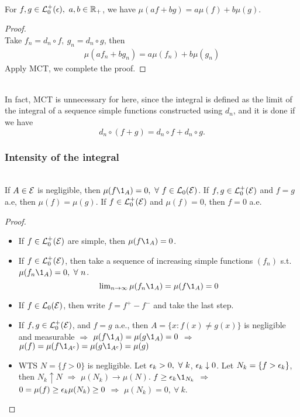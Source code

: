 \clearpage
\begin{corollary}\ \\
For $f,g \in \mathcal{L}_0^+(\epsilon),\ a,b \in \mathbb{R}_+$, we have $\mu(af + bg) = a\mu(f) + b\mu(g)$.
\end{corollary}
\begin{proof}\ \\
Take $f_n = d_n \circ f,\ g_n = d_n \circ g$, then
\begin{align*}
    \mu(af_n + bg_n) = a \mu(f_n) + b \mu(g_n)
\end{align*}
Apply MCT, we complete the proof.
\end{proof}
\begin{remark}\ \\
In fact, MCT is unnecessary for here, since the integral is defined as the limit of the integral of a sequence simple functions constructed using $d_n$, and it is done if we have
\begin{equation*}
    d_n \circ (f + g) = d_n \circ f + d_n \circ g.
\end{equation*}
\end{remark}

\vspace{6pt}
\subsubsection{Intensity of the integral}

\begin{proposition}\ \\
If $A \in \mathcal{E}$ is negligible, then $\mu(f \1_A) = 0,\ \forall\ f \in \Ls_0(\Es)$. If $f,g \in \mathcal{L}_0^+(\mathcal{E})$ and $f = g$ a.e, then $\mu(f) = \mu(g)$. If $f \in \mathcal{L}_0^+(\mathcal{E})$ and $\mu(f) = 0$, then $f = 0$ a.e. 
\end{proposition}
\begin{proof}\ 
\begin{itemize}
    \item If $f \in \mathcal{L}_0^+ (\mathcal{E})$ are simple, then $\mu(f \1_A) = 0$.
    \item If $f \in \mathcal{L}_0^+(\mathcal{E})$, then take a sequence of increasing simple functions $(f_n)$ s.t. $\mu(f_n \1_A) = 0,\ \forall\ n$.
    \begin{equation*}
        \limm{n}{\infty} \mu(f_n \1_A) = \mu(f \1_A) = 0 
    \end{equation*}
    \item If $f \in \mathcal{L}_0(\mathcal{E})$, then write $f = f^+ - f^-$ and take the last step.
    \item If $f,g \in \mathcal{L}_0^+(\mathcal{E})$, and $f = g$ a.e., then $A = \{x: f(x) \neq g(x)\}$ is negligible and measurable $\Rightarrow$ $\mu(f \1_A) = \mu(g \1_A) = 0$ $\Rightarrow$ $\mu(f) = \mu(f \1_{A^c}) = \mu(g \1_{A^c}) = \mu(g)$
    \item WTS $N = \{f > 0\}$ is negligible. Let $\ep_k > 0,\ \forall\ k$, $\epsilon_k \downarrow 0$. Let $N_k = \{f > \epsilon_k\}$, then $N_k \uparrow N$ $\Rightarrow$ $\mu(N_k) \to \mu(N)$. $f \geq \ep_k \1_{N_k}$ $\Rightarrow$ $0 = \mu(f) \geq \epsilon_k \mu(N_k) \geq 0$ $\Rightarrow$ $\mu(N_k) = 0,\ \forall\ k$.
  \end{itemize}
\end{proof}

